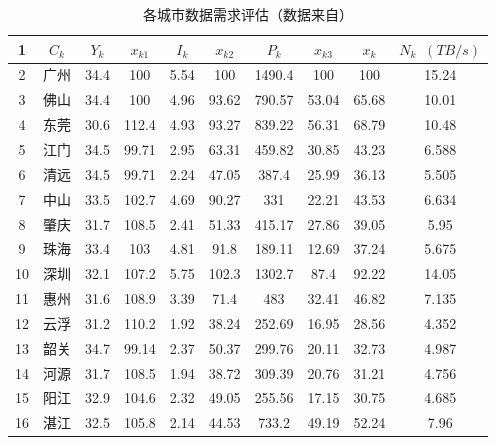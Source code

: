 \documentclass[UTF8,12pt]{ctexart}
\begin{document}
\begin{table}[H]
    \centering
    \caption{各城市数据需求评估（数据来自\cite{CSSJ}）}\label{PF}
    \begin{tabular}{cccccccccc}
        \toprule
        1  & $C_k$ & $Y_k$ & $x_{k1}$ & $I_k$ & $x_{k2}$ & $P_k$  & $x_{k3}$ & $x_k$ & $N_k$\, $(TB/s)$ \\
        \midrule
        2  & 广州  & 34.4  & 100      & 5.54  & 100      & 1490.4 & 100      & 100   & 15.24 \\
        \midrule
        3  & 佛山  & 34.4  & 100      & 4.96  & 93.62    & 790.57 & 53.04    & 65.68 & 10.01 \\
        \midrule
        4  & 东莞  & 30.6  & 112.4    & 4.93  & 93.27    & 839.22 & 56.31    & 68.79 & 10.48 \\
        \midrule
        5  & 江门  & 34.5  & 99.71    & 2.95  & 63.31    & 459.82 & 30.85    & 43.23 & 6.588 \\
        \midrule
        6  & 清远  & 34.5  & 99.71    & 2.24  & 47.05    & 387.4  & 25.99    & 36.13 & 5.505 \\
        \midrule
        7  & 中山  & 33.5  & 102.7    & 4.69  & 90.27    & 331    & 22.21    & 43.53 & 6.634 \\
        \midrule
        8  & 肇庆  & 31.7  & 108.5    & 2.41  & 51.33    & 415.17 & 27.86    & 39.05 & 5.95  \\
        \midrule
        9  & 珠海  & 33.4  & 103      & 4.81  & 91.8     & 189.11 & 12.69    & 37.24 & 5.675 \\
        \midrule
        10 & 深圳  & 32.1  & 107.2    & 5.75  & 102.3    & 1302.7 & 87.4     & 92.22 & 14.05 \\
        \midrule
        11 & 惠州  & 31.6  & 108.9    & 3.39  & 71.4     & 483    & 32.41    & 46.82 & 7.135 \\
        \midrule
        12 & 云浮  & 31.2  & 110.2    & 1.92  & 38.24    & 252.69 & 16.95    & 28.56 & 4.352 \\
        \midrule
        13 & 韶关  & 34.7  & 99.14    & 2.37  & 50.37    & 299.76 & 20.11    & 32.73 & 4.987 \\
        \midrule
        14 & 河源  & 31.7  & 108.5    & 1.94  & 38.72    & 309.39 & 20.76    & 31.21 & 4.756 \\
        \midrule
        15 & 阳江  & 32.9  & 104.6    & 2.32  & 49.05    & 255.56 & 17.15    & 30.75 & 4.685 \\
        \midrule
        16 & 湛江  & 32.5  & 105.8    & 2.14  & 44.53    & 733.2  & 49.19    & 52.24 & 7.96  \\

\end{tabular}
\end{table}
\end{document}
